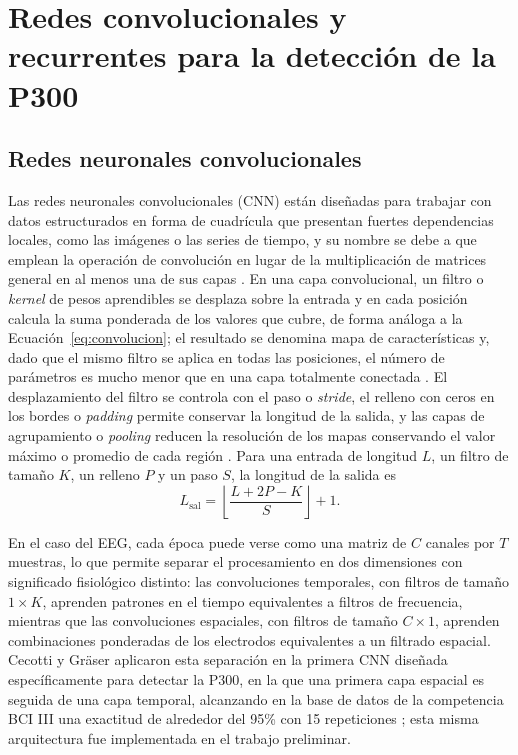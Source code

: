 \section[REDES CONVOLUCIONALES Y RECURRENTES PARA LA DETECCIÓN DE LA P300]{Redes convolucionales
y recurrentes para la detección de la P300}
\label{sec:cnn}

\subsection{Redes neuronales convolucionales}

Las redes neuronales convolucionales (CNN) están diseñadas para trabajar con datos estructurados
en forma de cuadrícula que presentan fuertes dependencias locales, como las imágenes o las series
de tiempo, y su nombre se debe a que emplean la operación de convolución en lugar de la
multiplicación de matrices general en al menos una de sus capas \cite{goodfellow2016}. En una capa
convolucional, un filtro o \textit{kernel} de pesos aprendibles se desplaza sobre la entrada y en
cada posición calcula la suma ponderada de los valores que cubre, de forma análoga a la
Ecuación~\eqref{eq:convolucion}; el resultado se denomina mapa de características y, dado que el
mismo filtro se aplica en todas las posiciones, el número de parámetros es mucho menor que en una
capa totalmente conectada \cite{aggarwal2018}. El desplazamiento del filtro se controla con el
paso o \textit{stride}, el relleno con ceros en los bordes o \textit{padding} permite conservar la
longitud de la salida, y las capas de agrupamiento o \textit{pooling} reducen la resolución de los
mapas conservando el valor máximo o promedio de cada región \cite{goodfellow2016}. Para una entrada
de longitud $L$, un filtro de tamaño $K$, un relleno $P$ y un paso $S$, la longitud de la salida es
\begin{equation}
L_{\text{sal}} = \left\lfloor \frac{L + 2P - K}{S} \right\rfloor + 1.
\label{eq:salida-conv}
\end{equation}

En el caso del EEG, cada época puede verse como una matriz de $C$ canales por $T$ muestras, lo que
permite separar el procesamiento en dos dimensiones con significado fisiológico distinto: las
convoluciones temporales, con filtros de tamaño $1\times K$, aprenden patrones en el tiempo
equivalentes a filtros de frecuencia, mientras que las convoluciones espaciales, con filtros de
tamaño $C\times1$, aprenden combinaciones ponderadas de los electrodos equivalentes a un filtrado
espacial. Cecotti y Gräser aplicaron esta separación en la primera CNN diseñada específicamente para
detectar la P300, en la que una primera capa espacial es seguida de una capa temporal, alcanzando
en la base de datos de la competencia BCI III una exactitud de alrededor del 95\% con 15 repeticiones
\cite{cecotti2011}; esta misma arquitectura fue implementada en el trabajo preliminar.

